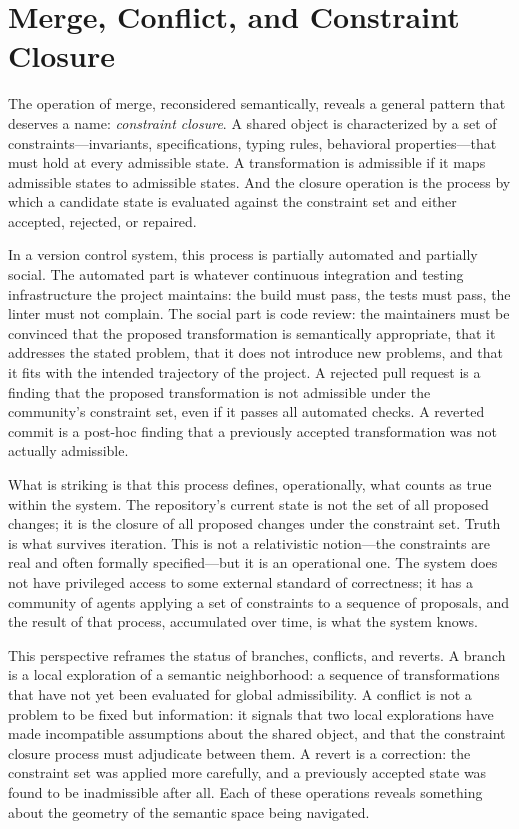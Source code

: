 \documentclass[12pt, letterpaper]{article}
\begin{document}
\section{Merge, Conflict, and Constraint Closure}

The operation of merge, reconsidered semantically, reveals a general pattern that deserves a name: \emph{constraint closure}. A shared object is characterized by a set of constraints---invariants, specifications, typing rules, behavioral properties---that must hold at every admissible state. A transformation is admissible if it maps admissible states to admissible states. And the closure operation is the process by which a candidate state is evaluated against the constraint set and either accepted, rejected, or repaired.

In a version control system, this process is partially automated and partially social. The automated part is whatever continuous integration and testing infrastructure the project maintains: the build must pass, the tests must pass, the linter must not complain. The social part is code review: the maintainers must be convinced that the proposed transformation is semantically appropriate, that it addresses the stated problem, that it does not introduce new problems, and that it fits with the intended trajectory of the project. A rejected pull request is a finding that the proposed transformation is not admissible under the community's constraint set, even if it passes all automated checks. A reverted commit is a post-hoc finding that a previously accepted transformation was not actually admissible.

What is striking is that this process defines, operationally, what counts as true within the system. The repository's current state is not the set of all proposed changes; it is the closure of all proposed changes under the constraint set. Truth is what survives iteration. This is not a relativistic notion---the constraints are real and often formally specified---but it is an operational one. The system does not have privileged access to some external standard of correctness; it has a community of agents applying a set of constraints to a sequence of proposals, and the result of that process, accumulated over time, is what the system knows.

This perspective reframes the status of branches, conflicts, and reverts. A branch is a local exploration of a semantic neighborhood: a sequence of transformations that have not yet been evaluated for global admissibility. A conflict is not a problem to be fixed but information: it signals that two local explorations have made incompatible assumptions about the shared object, and that the constraint closure process must adjudicate between them. A revert is a correction: the constraint set was applied more carefully, and a previously accepted state was found to be inadmissible after all. Each of these operations reveals something about the geometry of the semantic space being navigated.
\end{document}
